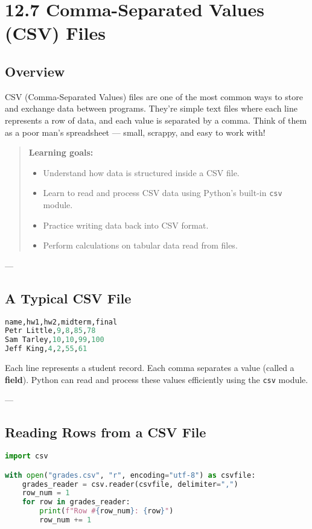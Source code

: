 \chapter{12.7 Comma-Separated Values (CSV) Files}

\section*{Overview}
CSV (Comma-Separated Values) files are one of the most common ways to store and exchange data between programs.  
They’re simple text files where each line represents a row of data, and each value is separated by a comma.  
Think of them as a poor man’s spreadsheet — small, scrappy, and easy to work with!

\begin{quote}
\textbf{Learning goals:}
\begin{itemize}
  \item Understand how data is structured inside a CSV file.
  \item Learn to read and process CSV data using Python’s built-in \texttt{csv} module.
  \item Practice writing data back into CSV format.
  \item Perform calculations on tabular data read from files.
\end{itemize}
\end{quote}

---

\section{A Typical CSV File}

\begin{lstlisting}[language=Python, caption={Sample contents of a CSV file.}]
name,hw1,hw2,midterm,final
Petr Little,9,8,85,78
Sam Tarley,10,10,99,100
Jeff King,4,2,55,61
\end{lstlisting}

Each line represents a student record. Each comma separates a value (called a \textbf{field}).  
Python can read and process these values efficiently using the \texttt{csv} module.

---

\section{Reading Rows from a CSV File}

\begin{lstlisting}[language=Python, caption={Reading each row in a CSV file.}]
import csv

with open("grades.csv", "r", encoding="utf-8") as csvfile:
    grades_reader = csv.reader(csvfile, delimiter=",")
    row_num = 1
    for row in grades_reader:
        print(f"Row #{row_num}: {row}")
        row_num += 1
\end{lstlisting}

